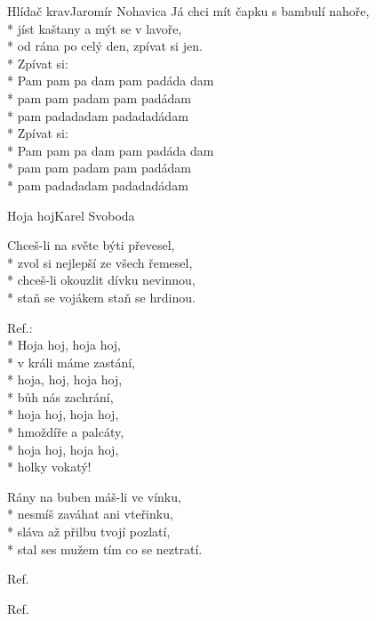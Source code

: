 \documentclass[10.5pt]{book}
\begin{document}
\begin{poem}{Hlídač krav}{Jaromír Nohavica}
Já chci mít čapku s bambulí nahoře,\\*
jíst kaštany a mýt se v lavoře,\\*
od rána po celý den, zpívat si jen.\\*
Zpívat si:\\*
Pam pam pa dam pam padáda dam\\*
pam pam padam pam padádam\\*
pam padadadam padadadádam\\*
Zpívat si:\\*
Pam pam pa dam pam padáda dam\\*
pam pam padam pam padádam\\*
pam padadadam padadadádam

\end{poem}

\begin{poem}{Hoja hoj}{Karel Svoboda}

\settowidth{\versewidth}{zvol si nejlepší ze všech řemesel,}

Chceš-li na světe býti převesel,\\*
zvol si nejlepší ze všech řemesel,\\*
chceš-li okouzlit dívku nevinnou,\\*
staň se vojákem staň se hrdinou.

Ref.:\\*
Hoja hoj, hoja hoj,\\*
v králi máme zastání,\\*
hoja, hoj, hoja hoj,\\*
bůh nás zachrání,\\*
hoja hoj, hoja hoj,\\*
hmoždíře a palcáty,\\*
hoja hoj, hoja hoj,\\*
holky vokatý!

Rány na buben máš-li ve vínku,\\*
nesmíš zaváhat ani vteřinku,\\*
sláva až přilbu tvojí pozlatí,\\*
stal ses mužem tím co se neztratí.

Ref.

Ref.

\end{poem}
\end{document}
